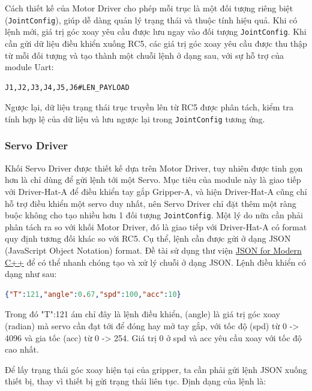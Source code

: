 Cách thiết kế của Motor Driver cho phép mỗi trục là một đối tượng riêng biệt (\lstinline[style=inlinecode]{JointConfig}), giúp dễ dàng quản lý trạng thái và thuộc tính hiệu quả. Khi có lệnh mới, giá trị góc xoay yêu cầu được lưu ngay vào đối tượng \lstinline[style=inlinecode]{JointConfig}. Khi cần gửi dữ liệu điều khiển xuống RC5, các giá trị góc xoay yêu cầu được thu thập từ mỗi đối tượng và tạo thành một chuỗi lệnh ở dạng sau, với sự hỗ trợ của module Uart:

\begin{lstlisting}
J1,J2,J3,J4,J5,J6#LEN_PAYLOAD
\end{lstlisting}

Ngược lại, dữ liệu trạng thái trục truyền lên từ RC5 được phân tách, kiểm tra tính hợp lệ của dữ liệu và lưu ngược lại trong \lstinline[style=inlinecode]{JointConfig} tương ứng.

\subsubsection{Servo Driver}

Khối Servo Driver được thiết kế dựa trên Motor Driver, tuy nhiên được tinh gọn hơn là chỉ dùng để gửi lệnh tới một Servo. Mục tiêu của module này là giao tiếp với Driver-Hat-A để điều khiển tay gắp Gripper-A, và hiện Driver-Hat-A cũng chỉ hỗ trợ điều khiển một servo duy nhất, nên Servo Driver chỉ đặt thêm một ràng buộc không cho tạo nhiều hơn 1 đối tượng \lstinline[style=inlinecode]{JointConfig}. Một lý do nữa cần phải phân tách ra so với khối Motor Driver, đó là giao tiếp với Driver-Hat-A có format quy định tương đối khác so với RC5. Cụ thể, lệnh cần được gửi ở dạng JSON (JavaScript Object Notation) format. Đề tài sử dụng thư viện \href{https://github.com/nlohmann/json}{JSON for Modern C++} để có thể nhanh chóng tạo và xử lý chuỗi ở dạng JSON. Lệnh điều khiển có dạng như sau:

\begin{lstlisting}[language=json]
{"T":121,"angle":0.67,"spd":100,"acc":10}
\end{lstlisting}

Trong đó "T":121 ám chỉ đây là lệnh điều khiển, (angle) là giá trị góc xoay (radian) mà servo cần đạt tới để đóng hay mở tay gắp, với tốc độ (spd) từ 0 -> 4096 và gia tốc (acc) từ 0 -> 254. Giá trị 0 ở spd và acc yêu cầu xoay với tốc độ cao nhất.

Để lấy trạng thái góc xoay hiện tại của gripper, ta cần phải gửi lệnh JSON xuống thiết bị, thay vì thiết bị gửi trạng thái liên tục. Định dạng của lệnh là:

